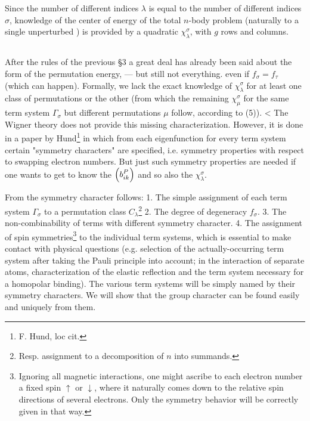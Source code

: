 \begin{paper}{1}
Since the number of different indices $\lambda$ is equal to the number of different indices $\sigma$, knowledge of the center of energy of the total $n$-body problem (naturally to a single unperturbed ) is provided by a quadratic  $\chi_\lambda^\sigma$, with $g$ rows and columns.

\subsection{} After the rules of the previous \S3 a great deal has already been said about the form of the permutation energy, — but still not everything.  even if $f_\sigma=f_\tau$ (which can happen). Formally, we lack the exact knowledge of $\chi_\lambda^\sigma$ for at least one class of permutations or the other (from which the remaining $\chi_\mu^\sigma$ for the same term system $\Gamma_\sigma$ but different permutations $\mu$ follow, according to (5)).
<
The Wigner theory does not provide this missing characterization. However, it is done in a paper by Hund\footnote{F. Hund, loc cit.} in which from each eigenfunction for every term system certain "symmetry characters" are specified, i.e. symmetry properties with respect to swapping electron numbers. But just such symmetry properties are needed if one wants to get to know the $\Aikp{b}{ik}{P}$ and so also the $\chi_\lambda^\sigma$.

From the symmetry character follows: 1. The simple assignment of each term system $\Gamma_\sigma$ to a permutation class $C_\lambda$\footnote{Resp. assignment to a decomposition of $n$ into summands.} 2. The degree of degeneracy $f_\sigma$. 3. The non-combinability of terms with different symmetry character. 4. The assignment of spin symmetries\footnote{Ignoring all magnetic interactions, one might ascribe to each electron number a fixed spin $\uparrow$ or $\downarrow$, where it naturally comes down to the relative spin directions of several electrons. Only the symmetry behavior will be correctly given in that way.} to the individual term systems, which is essential to make contact with physical questions (e.g. selection of the actually-occurring term system after taking the Pauli principle into account; in the interaction of separate atoms, characterization of the elastic reflection and the term system necessary for a homopolar binding). The various term systems will be simply named by their symmetry characters. We will show that the group character can be found easily and uniquely from them.


\end{paper}
